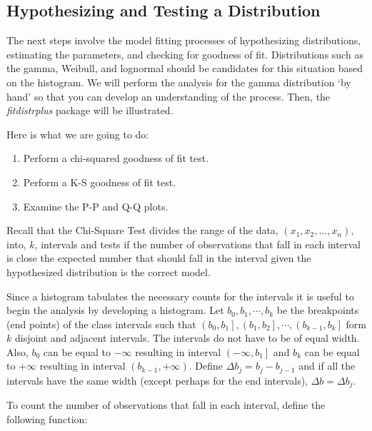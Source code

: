 \documentclass[
]{book}
\theoremstyle{definition}
\theoremstyle{definition}
\theoremstyle{definition}
\theoremstyle{definition}
\theoremstyle{remark}
\begin{document}
\hypertarget{app:idm:subsec:hypothDist}{%
\subsection{Hypothesizing and Testing a Distribution}\label{app:idm:subsec:hypothDist}}

The next steps involve the model fitting processes of hypothesizing
distributions, estimating the parameters, and checking for goodness of
fit. Distributions such as the gamma, Weibull, and lognormal should be
candidates for this situation based on the histogram. We will perform
the analysis for the gamma distribution `by hand' so that you can
develop an understanding of the process. Then, the \emph{fitdistrplus}
package will be illustrated.

Here is what we are going to do:

\begin{enumerate}
\def\labelenumi{\arabic{enumi}.}
\item
  Perform a chi-squared goodness of fit test.
\item
  Perform a K-S goodness of fit test.
\item
  Examine the P-P and Q-Q plots.
\end{enumerate}

Recall that the Chi-Square Test divides the range of the data, \((x_1, x_2, \dots, x_n)\), into,
\(k\), intervals and tests if the number of observations that fall in each
interval is close the expected number that should fall in the interval
given the hypothesized distribution is the correct model.

Since a histogram tabulates the necessary counts for the intervals it is
useful to begin the analysis by developing a histogram. Let
\(b_{0}, b_{1}, \cdots, b_{k}\) be the breakpoints (end points) of the
class intervals such that
\(\left(b_{0}, b_{1} \right], \left(b_{1}, b_{2} \right], \cdots, \left(b_{k-1}, b_{k} \right]\)
form \(k\) disjoint and adjacent intervals. The intervals do not have to
be of equal width. Also, \(b_{0}\) can be equal to \(-\infty\) resulting in
interval \(\left(-\infty, b_{1} \right]\) and \(b_{k}\) can be equal to
\(+\infty\) resulting in interval \(\left(b_{k-1}, +\infty \right)\). Define
\(\Delta b_j = b_{j} - b_{j-1}\) and if all the intervals have the same
width (except perhaps for the end intervals), \(\Delta b = \Delta b_j\).

To count the number of observations that fall in each interval, define the following function:
\end{document}
